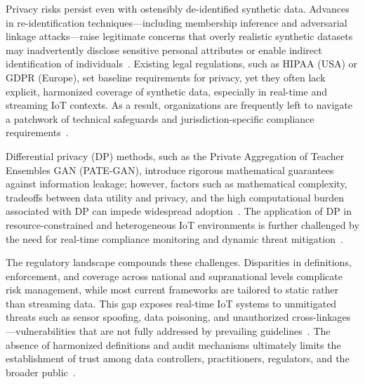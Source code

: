 Privacy risks persist even with ostensibly de-identified synthetic data. Advances in re-identification techniques—including membership inference and adversarial linkage attacks—raise legitimate concerns that overly realistic synthetic datasets may inadvertently disclose sensitive personal attributes or enable indirect identification of individuals~\cite{ref91,ref106}. Existing legal regulations, such as HIPAA (USA) or GDPR (Europe), set baseline requirements for privacy, yet they often lack explicit, harmonized coverage of synthetic data, especially in real-time and streaming IoT contexts. As a result, organizations are frequently left to navigate a patchwork of technical safeguards and jurisdiction-specific compliance requirements~\cite{ref2,ref4,ref5,ref6,ref7,ref8,ref9,ref10,ref24,ref25,ref28,ref30,ref31,ref33,ref34,ref35,ref36,ref41,ref43,ref46,ref50,ref54,ref51,ref61,ref62,ref63,ref64,ref65,ref70,ref71,ref72,ref75,ref76,ref77,ref78,ref79,ref82,ref83,ref84,ref90,ref91}.

Differential privacy (DP) methods, such as the Private Aggregation of Teacher Ensembles GAN (PATE-GAN), introduce rigorous mathematical guarantees against information leakage; however, factors such as mathematical complexity, tradeoffs between data utility and privacy, and the high computational burden associated with DP can impede widespread adoption~\cite{ref91}. The application of DP in resource-constrained and heterogeneous IoT environments is further challenged by the need for real-time compliance monitoring and dynamic threat mitigation~\cite{ref2,ref4,ref5,ref6,ref7,ref8,ref9,ref10,ref24,ref25,ref28,ref30,ref31,ref33,ref34,ref35,ref36,ref41,ref43,ref46,ref50,ref54,ref51,ref61,ref62,ref63,ref64,ref65,ref70,ref71,ref72,ref75,ref76,ref77,ref78,ref79,ref82,ref83,ref84,ref90,ref91}.

The regulatory landscape compounds these challenges. Disparities in definitions, enforcement, and coverage across national and supranational levels complicate risk management, while most current frameworks are tailored to static rather than streaming data. This gap exposes real-time IoT systems to unmitigated threats such as sensor spoofing, data poisoning, and unauthorized cross-linkages—vulnerabilities that are not fully addressed by prevailing guidelines~\cite{ref4,ref5,ref10,ref24,ref25,ref30,ref31,ref33,ref34,ref35,ref36,ref41,ref43,ref46,ref50,ref54,ref61,ref62,ref63,ref64,ref65,ref76,ref77,ref82,ref83,ref84,ref91}. The absence of harmonized definitions and audit mechanisms ultimately limits the establishment of trust among data controllers, practitioners, regulators, and the broader public~\cite{ref91}.

